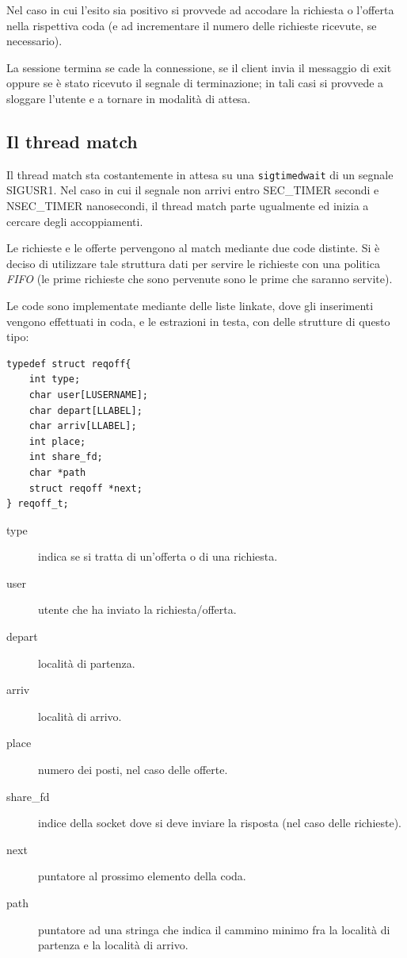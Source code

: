 \documentclass[a4paper,10pt]{article}
\begin{document}
Nel caso in cui l'esito sia positivo si provvede ad accodare la richiesta o l'offerta nella rispettiva coda (e ad incrementare il numero delle richieste ricevute, se necessario).

La sessione termina se cade la connessione, se il client invia il messaggio di exit oppure se \`e stato ricevuto il segnale di terminazione; in tali casi si provvede a sloggare l'utente e a tornare in modalit\`a di attesa.

\subsection{Il thread match}

Il thread match sta costantemente in attesa su una \texttt{sigtimedwait} di un segnale SIGUSR1. Nel caso in cui il segnale non arrivi entro SEC\_TIMER secondi e NSEC\_TIMER nanosecondi, il thread match parte ugualmente ed inizia a cercare degli accoppiamenti.

Le richieste e le offerte pervengono al match mediante due code distinte. Si \`e deciso di utilizzare tale struttura dati per servire le richieste con una politica \textit{FIFO} (le prime richieste che sono pervenute sono le prime che saranno servite).

Le code sono implementate mediante delle liste linkate, dove gli inserimenti vengono effettuati in coda, e le estrazioni in testa, con delle strutture di questo tipo:

\begin{verbatim}
typedef struct reqoff{
    int type;
    char user[LUSERNAME];
    char depart[LLABEL];
    char arriv[LLABEL];
    int place;
    int share_fd;
    char *path
    struct reqoff *next;
} reqoff_t;
\end{verbatim}
\begin{description}
	\item[type] indica se si tratta di un'offerta o di una richiesta.
	\item[user] utente che ha inviato la richiesta/offerta.
	\item[depart] localit\`a di partenza.
	\item[arriv] localit\`a di arrivo.
	\item[place] numero dei posti, nel caso delle offerte.
	\item[share\_fd] indice della socket dove si deve inviare la risposta (nel caso delle richieste).
	\item[next] puntatore al prossimo elemento della coda.
	\item[path] puntatore ad una stringa che indica il cammino minimo fra la localit\`a di partenza e la localit\`a di arrivo.
\end{description}
\end{document}

